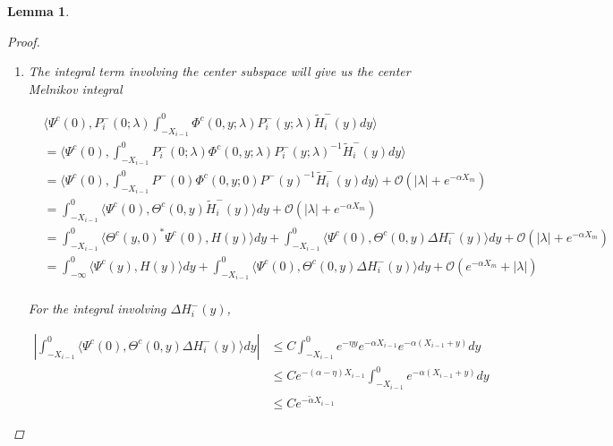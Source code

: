 \documentclass[12pt]{article}
\newtheorem{lemma}{Lemma}
\begin{document}
\begin{lemma}
\begin{proof}
\begin{enumerate}
Combining all of these, the terms involving $c_i$ are given by

\begin{align*}
e^{\nu(\lambda) X_{i-1} } &c_{i-1}^- - e^{-\nu(\lambda)X_i} c_i^- + \mathcal{O}\Big( (|\lambda| + e^{-\alpha X_m})(|\tilde{c}_{i-1}^+| + |\tilde{c}_i^-|) + e^{-(\alpha - \eta) X_i}  (|\lambda| + e^{-\tilde{\alpha}X_m})|\tilde{c}_{i+1}^-| \\
&+ e^{-\tilde{\alpha}X_m}(|\lambda| + |D_i|)|d| \Big)  
\end{align*}

\item The integral term involving the center subspace will give us the center Melnikov integral

\begin{align*}
&\langle \Psi^c(0), P_i^-(0; \lambda) \int_{-X_{i-1}}^0 \Phi^c(0, y; \lambda) P_i^-(y; \lambda) \tilde{H}_i^-(y) dy \rangle \\
&= \langle \Psi^c(0), \int_{-X_{i-1}}^0 P_i^-(0; \lambda) \Phi^c(0, y; \lambda) P_i^-(y; \lambda)^{-1} \tilde{H}_i^-(y) dy \rangle \\
&= \langle \Psi^c(0), \int_{-X_{i-1}}^0 P^-(0) \Phi^c(0, y; 0) P^-(y)^{-1} \tilde{H}_i^-(y) dy \rangle + \mathcal{O}(|\lambda| + e^{-\alpha X_m}) \\
&= \int_{-X_{i-1}}^0 \langle \Psi^c(0), \Theta^c(0, y) \tilde{H}_i^-(y) \rangle dy + \mathcal{O}(|\lambda| + e^{-\alpha X_m}) \\
&= \int_{-X_{i-1}}^0 \langle \Theta^c(y, 0)^* \Psi^c(0), H(y) \rangle dy + \int_{-X_{i-1}}^0 \langle \Psi^c(0), \Theta^c(0, y) \Delta H_i^-(y) \rangle dy + \mathcal{O}(|\lambda| + e^{-\alpha X_m}) \\
&= \int_{-\infty}^0 \langle \Psi^c(y), H(y) \rangle dy + \int_{-X_{i-1}}^0 \langle \Psi^c(0), \Theta^c(0, y) \Delta H_i^-(y) \rangle dy + \mathcal{O}(e^{-\alpha X_m} + |\lambda|) \\
\end{align*}

For the integral involving $\Delta H_i^-(y)$,

\begin{align*}
\left| \int_{-X_{i-1}}^0 \langle \Psi^c(0), \Theta^c(0, y) \Delta H_i^-(y) \rangle dy \right| &\leq C \int_{-X_{i-1}}^0 e^{-\eta y} e^{-\alpha X_{i-1}} e^{-\alpha(X_{i-1} + y)} dy \\
&\leq C e^{-(\alpha - \eta)X_{i-1}} \int_{-X_{i-1}}^0 e^{-\alpha(X_{i-1} + y)} dy \\
&\leq C e^{-\tilde{\alpha}X_{i-1}}
\end{align*}


\end{enumerate}
\end{proof}
\end{lemma}
\end{document}
